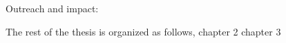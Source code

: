 

% 
Outreach and impact:

% 
The rest of the thesis is organized as follows,
chapter 2 
chapter 3 

